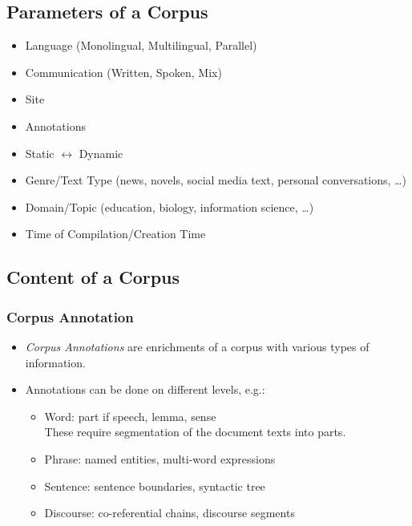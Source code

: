         \subsection{Parameters of a Corpus} %
            \begin{itemize}
            	\item Language (Monolingual, Multilingual, Parallel)
            	\item Communication (Written, Spoken, Mix)
            	\item Site
            	\item Annotations
            	\item Static \(\leftrightarrow\) Dynamic
            	\item Genre/Text Type (news, novels, social media text, personal conversations, \dots)
            	\item Domain/Topic (education, biology, information science, \dots)
            	\item Time of Compilation/Creation Time
            \end{itemize}

        \subsection{Content of a Corpus} %
            \subsubsection{Corpus Annotation} %
                \begin{itemize}
                	\item \textit{Corpus Annotations} are enrichments of a corpus with various types of information.
                	\item Annotations can be done on different levels, e.g.:
                		\begin{itemize}
                			\item Word: part if speech, lemma, sense \\ These require segmentation of the document texts into parts.
                			\item Phrase: named entities, multi-word expressions
                			\item Sentence: sentence boundaries, syntactic tree
                			\item Discourse: co-referential chains, discourse segments
                		\end{itemize}
                \end{itemize}

